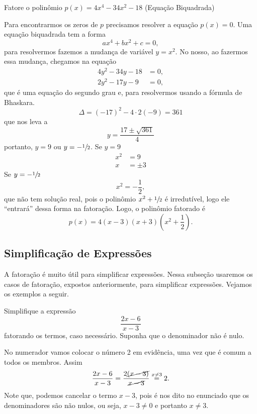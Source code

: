 \begin{example}
  Fatore o polinômio
  \(
    p(x) = 4x^4 - 34x^2 - 18
  \)
 (Equação Biquadrada)

  \solution
  Para encontrarmos os zeros de $p$ precisamos resolver a equação $p(x)=0$.
  Uma equação biquadrada tem a forma
  \[
    ax^4 + bx^2 + c = 0,
  \]
  para resolvermos fazemos a mudança de variável $y=x^2$.
  No nosso, ao fazermos essa mudança, chegamos na
  equação
  \begin{align*}
    4y^2 - 34y - 18 & = 0, \\
    2y^2 - 17y - 9  & = 0,
  \end{align*}
  que é uma equação do segundo
  grau e, para resolvermos usando  a fórmula de Bhaskara.
  \[
    \Delta = (-17)^2 - 4 \cdot 2(-9) = 361
  \]
  que nos leva a
  \[
    y = \frac{17 \pm \sqrt{361}}{4}
  \]
  portanto, $y = 9$ ou $y=-\sfrac{1}{2}$.
  Se $y=9$
  \begin{align*}
    x^2 & = 9 \\
    x   & = \pm 3
  \end{align*}
  Se $y=-\sfrac{1}{2}$
  \[
    x^2 = -\frac{1}{2},
  \]
  que não tem solução real, pois o polinômio $x^2+\sfrac{1}{2}$
  é irredutível, logo ele ``entrará'' dessa forma na fatoração.
  Logo, o polinômio fatorado é
  \[
    p(x) = 4 (x-3) (x+3) \left(x^2+\frac{1}{2} \right).
  \]
\end{example}

\subsection{Simplificação de Expressões}

A fatoração é muito útil para simplificar expressões. Nessa subseção usaremos
os casos de fatoração, expostos anteriormente, para simplificar expressões.
Vejamos os exemplos a seguir.

\begin{example}
  Simplifique a expressão
  \[
    \frac{2x-6}{x-3}
  \]
  fatorando os termos, caso necessário.
  Suponha que o denominador não é nulo.

  \solution
  No numerador vamos colocar o número 2 em evidência, uma vez que é comum a
  todos os membros. Assim
  \[
    \frac{2x-6}{x-3}
    = \frac{2\cancel{(x-3)}}{\cancel{x-3}}
    \stackrel{x \neq 3}{=}2.
  \]
  Note que, podemos cancelar o termo $x-3$, pois é nos dito no enunciado que os
  denominadores são não nulos, ou seja, $x-3 \neq 0$ e portanto $x \neq 3$.
\end{example}

